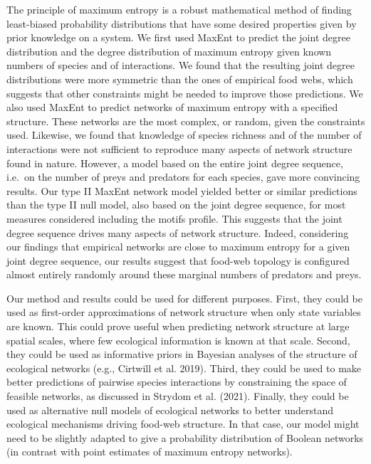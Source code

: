 \documentclass[11pt]{article}
\begin{document}
The principle of maximum entropy is a robust mathematical method of
finding least-biased probability distributions that have some desired
properties given by prior knowledge on a system. We first used MaxEnt to
predict the joint degree distribution and the degree distribution of
maximum entropy given known numbers of species and of interactions. We
found that the resulting joint degree distributions were more symmetric
than the ones of empirical food webs, which suggests that other
constraints might be needed to improve those predictions. We also used
MaxEnt to predict networks of maximum entropy with a specified
structure. These networks are the most complex, or random, given the
constraints used. Likewise, we found that knowledge of species richness
and of the number of interactions were not sufficient to reproduce many
aspects of network structure found in nature. However, a model based on
the entire joint degree sequence, i.e.~on the number of preys and
predators for each species, gave more convincing results. Our type II
MaxEnt network model yielded better or similar predictions than the type
II null model, also based on the joint degree sequence, for most
measures considered including the motifs profile. This suggests that the
joint degree sequence drives many aspects of network structure. Indeed,
considering our findings that empirical networks are close to maximum
entropy for a given joint degree sequence, our results suggest that
food-web topology is configured almost entirely randomly around these
marginal numbers of predators and preys.

Our method and results could be used for different purposes. First, they
could be used as first-order approximations of network structure when
only state variables are known. This could prove useful when predicting
network structure at large spatial scales, where few ecological
information is known at that scale. Second, they could be used as
informative priors in Bayesian analyses of the structure of ecological
networks (e.g., Cirtwill et al. 2019). Third, they could be used to make
better predictions of pairwise species interactions by constraining the
space of feasible networks, as discussed in Strydom et al. (2021).
Finally, they could be used as alternative null models of ecological
networks to better understand ecological mechanisms driving food-web
structure. In that case, our model might need to be slightly adapted to
give a probability distribution of Boolean networks (in contrast with
point estimates of maximum entropy networks).
\end{document}
